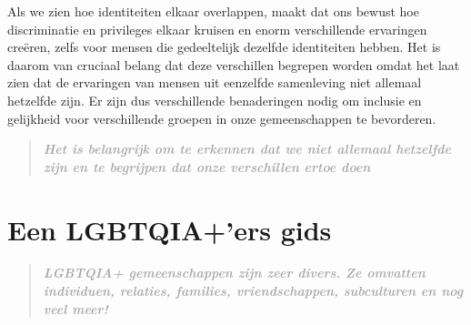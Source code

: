 \documentclass[12pt,openany]{book}
\begin{document}
Als we zien hoe identiteiten elkaar overlappen, maakt dat ons bewust hoe discriminatie en privileges elkaar kruisen en enorm verschillende ervaringen creëren, zelfs voor mensen die gedeeltelijk dezelfde identiteiten hebben. Het is daarom van cruciaal belang dat deze verschillen begrepen worden omdat het laat zien dat de ervaringen van mensen uit eenzelfde samenleving niet allemaal hetzelfde zijn. Er zijn dus verschillende benaderingen nodig om inclusie en gelijkheid voor verschillende groepen in onze gemeenschappen te bevorderen.

\begin{quote}
\textit{\large \textbf{\textcolor{darkgray}{Het is belangrijk om te erkennen dat we niet allemaal hetzelfde zijn en te begrijpen dat onze verschillen ertoe doen}}}
\end{quote}

\begin{figure}[h]
    \centering
\end{figure}

\chapter*{Een LGBTQIA+'ers gids}

\begin{quote}
\textit{\large \textbf{\textcolor{darkgray}{LGBTQIA+ gemeenschappen zijn zeer divers. Ze omvatten individuen, relaties, families, vriendschappen, subculturen en nog veel meer!}}}
\end{quote}
\end{document}
